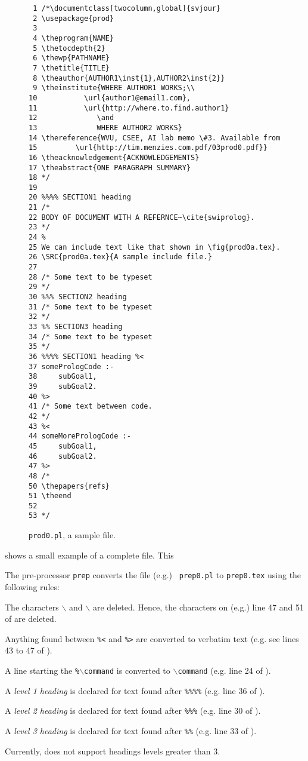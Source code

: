 \begin{figure}
{\scriptsize \begin{verbatim}
 1 /*\documentclass[twocolumn,global]{svjour}
 2 \usepackage{prod}
 3
 4 \theprogram{NAME}
 5 \thetocdepth{2}
 6 \thewp{PATHNAME}
 7 \thetitle{TITLE}
 8 \theauthor{AUTHOR1\inst{1},AUTHOR2\inst{2}}
 9 \theinstitute{WHERE AUTHOR1 WORKS;\\
10           \url{author1@email1.com},
11           \url{http://where.to.find.author1}
12              \and
13              WHERE AUTHOR2 WORKS}
14 \thereference{WVU, CSEE, AI lab memo \#3. Available from
15         \url{http://tim.menzies.com.pdf/03prod0.pdf}}
16 \theacknowledgement{ACKNOWLEDGEMENTS}
17 \theabstract{ONE PARAGRAPH SUMMARY}
18 */
19
20 %%%% SECTION1 heading
21 /*
22 BODY OF DOCUMENT WITH A REFERNCE~\cite{swiprolog}.
23 */
24 %
25 We can include text like that shown in \fig{prod0a.tex}.
26 \SRC{prod0a.tex}{A sample include file.}
27
28 /* Some text to be typeset
29 */
30 %%% SECTION2 heading
31 /* Some text to be typeset
32 */
33 %% SECTION3 heading
34 /* Some text to be typeset
35 */
36 %%%% SECTION1 heading %<
37 somePrologCode :-
38     subGoal1,
39     subGoal2.
40 %>
41 /* Some text between code.
42 */
43 %<
44 someMorePrologCode :-
45     subGoal1,
46     subGoal2.
47 %>
48 /*
50 \thepapers{refs}
51 \theend
52 
53 */
\end{verbatim}}
\caption[{\tt prod0.pl}]{{\tt prod0.pl}, a sample {\PROD}
file.}\label{fig:prod0sample}
\end{figure}

 shows a small example
of a complete {\PROD} file. This

The pre-processor {\tt prep} converts the file (e.g.) {\tt
prep0.pl} to {\tt prep0.tex} using the following rules: \bi \item
The characters {$\backslash$}{\tt *} and {\tt *}{$\backslash$} are deleted. Hence, the
characters on (e.g.) line 47 and 51 of  are
deleted. \item Anything found between {\tt \%<} and {\tt \%>} are
converted to verbatim text (e.g. see lines 43 to 47 of
). \item A line starting the {\tt \%{$\backslash$}command} is
converted to {\tt {$\backslash$}command} (e.g. line 24 of
).
\item A {\em level 1 heading} is declared for text
found after {\tt \%\%\%\%} (e.g. line 36 of ).
 \item A {\em level 2 heading} is declared for text
found after {\tt \%\%\%} (e.g. line 30 of ).
 \item A {\em level 3 heading} is declared for text
found after {\tt \%\%} (e.g. line 33 of ).
\item Currently, {\PROD} does not support headings levels greater than 3.
\ei

